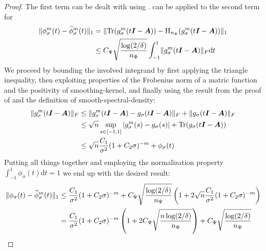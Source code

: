 \begin{proof}
    The first term can be dealt with using .
     can be applied to the second term for
    \begin{align}
        \lVert \phi_{\sigma}^m(t) - \widetilde{\phi}_{\sigma}^m(t) \rVert _1
            &= \lVert \operatorname{Tr}(g_{\sigma}^m(t\boldsymbol{I} - \boldsymbol{A})) - \operatorname{H}_{n_{\Psi}}(g_{\sigma}^m(t\boldsymbol{I} - \boldsymbol{A})) \rVert _1 \notag \\
            &\leq C_{\Psi} \sqrt{\frac{\log(2/\delta)}{n_{\Psi}}} \int_{-1}^{1} \lVert g_{\sigma}^m(t\boldsymbol{I} - \boldsymbol{A}) \rVert _F \mathrm{d}t
    \end{align}
    We proceed by bounding the involved integrand by first applying the triangle
    inequality, then exploiting properties of the Frobenius norm of a matric function and
    the positivity of \gls{smoothing-kernel}, and finally using the result from the proof
    of  and the definition of \gls{smooth-spectral-density}:
    \begin{align}
        \lVert g_{\sigma}^m(t\boldsymbol{I} - \boldsymbol{A}) \rVert _F
        &\leq \lVert g_{\sigma}^m(t\boldsymbol{I} - \boldsymbol{A}) - g_{\sigma}(t\boldsymbol{I} - \boldsymbol{A}) \rVert _F + \lVert g_{\sigma}(t\boldsymbol{I} - \boldsymbol{A}) \rVert _F \notag \\
        &\leq \sqrt{n} \sup_{s \in [-1, 1]} | g_{\sigma}^m(s) - g_{\sigma}(s) | + \operatorname{Tr}(g_{\sigma}(t\boldsymbol{I} - \boldsymbol{A})) \notag \\
        &\leq \sqrt{n} \frac{C_1}{\sigma^2} (1 + C_2 \sigma)^{-m} + \phi_{\sigma}(t)
    \end{align}
    Putting all things together and employing the normalization property $\int_{-1}^{1} \phi_{\sigma}(t) \mathrm{d}t = 1$
    we end up with the desired result:
    \begin{align}
        \lVert \phi_{\sigma}(t)  - \widetilde{\phi}_{\sigma}^m(t) \rVert _1
        &\leq \frac{C_1}{\sigma^2} (1 + C_2 \sigma)^{-m} + C_{\Psi} \sqrt{\frac{\log(2/\delta)}{n_{\Psi}}} \left( 1 + 2 \sqrt{n} \frac{C_1}{\sigma^2} (1 + C_2 \sigma)^{-m} \right) \notag \\
        &= \frac{C_1}{\sigma^2} (1 + C_2 \sigma)^{-m} \left( 1 + 2 C_{\Psi} \sqrt{\frac{n \log(2/\delta)}{n_{\Psi}}} \right) + C_{\Psi} \sqrt{\frac{\log(2/\delta)}{n_{\Psi}}}
    \end{align}
\end{proof}
